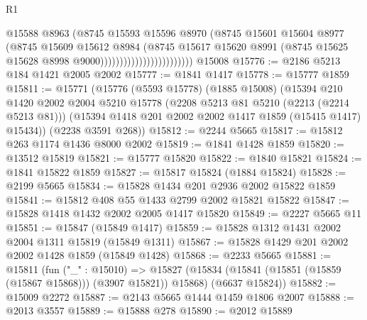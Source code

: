 \begin{lexlean}{R1}
\begin{coremodule}
                                          @15588
                                          @8963
                                          (@8745
                                            @15593
                                            @15596
                                            @8970
                                            (@8745
                                              @15601
                                              @15604
                                              @8977
                                              (@8745
                                                @15609
                                                @15612
                                                @8984
                                                (@8745
                                                  @15617
                                                  @15620
                                                  @8991
                                                  (@8745
                                                    @15625
                                                    @15628
                                                    @8998
                                                    @9000))))))))))))))))))))))))
    @15008
@15776 := @2186 @5213 @184 @1421 @2005 @2002
@15777 := @1841 @1417
@15778 := @15777 @1859
@15811 := @15771
    (@15776
      (@5593 @15778)
      (@1885 @15008)
      (@15394
        @210
        @1420
        @2002
        @2004
        @5210
        @15778
        (@2208 @5213 @81 @5210 (@2213 (@2214 @5213 @81)))
        (@15394 @1418 @201 @2002 @2002 @1417 @1859 (@15415 @1417) @15434))
      (@2238 @3591 @268))
@15812 := @2244 @5665
@15817 := @15812 @263 @1174 @1436 @8000 @2002
@15819 := @1841 @1428 @1859
@15820 := @13512 @15819
@15821 := @15777 @15820
@15822 := @1840 @15821
@15824 := @1841 @15822 @1859
@15827 := @15817 @15824 (@1884 @15824)
@15828 := @2199 @5665
@15834 := @15828 @1434 @201 @2936 @2002 @15822 @1859
@15841 := @15812 @408 @55 @1433 @2799 @2002 @15821 @15822
@15847 := @15828 @1418 @1432 @2002 @2005 @1417 @15820
@15849 := @2227 @5665 @11
@15851 := @15847 (@15849 @1417)
@15859 := @15828 @1312 @1431 @2002 @2004 @1311 @15819 (@15849 @1311)
@15867 := @15828 @1429 @201 @2002 @2002 @1428 @1859 (@15849 @1428)
@15868 := @2233 @5665
@15881 := @15811
    (fun ("_" : @15010) =>
    @15827 (@15834 (@15841 (@15851 (@15859 (@15867 @15868))) (@3907 @15821)) @15868) (@6637 @15824))
@15882 := @15009 @2272
@15887 := @2143 @5665 @1444 @1459 @1806 @2007
@15888 := @2013 @3557
@15889 := @15888 @278
@15890 := @2012 @15889

\end{coremodule}
\end{lexlean}
